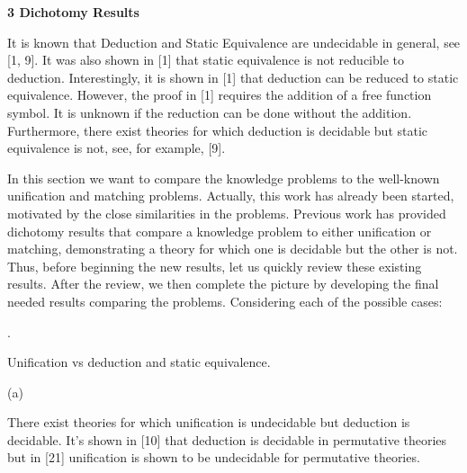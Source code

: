  
 
 


 
\par\medskip\noindent\textbf{3 Dichotomy Results}\par
 
 
It is known that Deduction and Static Equivalence are undecidable in general, see [1, 9]. It was also shown in [1] that static equivalence is not reducible to deduction. Interestingly, it is shown in [1] that deduction can be reduced to static equivalence. However, the proof in [1] requires the addition of a free function symbol. It is unknown if the reduction can be done without the addition. Furthermore, there exist theories for which deduction is decidable but static equivalence is not, see, for example, [9].\par
 
 
 
In this section we want to compare the knowledge problems to the well-known unification and matching problems. Actually, this work has already been started, motivated by the close similarities in the problems. Previous work has provided dichotomy results that compare a knowledge problem to either unification or matching, demonstrating a theory for which one is decidable but the other is not. Thus, before beginning the new results, let us quickly review these existing results. After the review, we then complete the picture by developing the final needed results comparing the problems. Considering each of the possible cases:\par
  
\par{}. 
 
Unification vs deduction and static equivalence.\par
  
\par\noindent  (a) 
 
There exist theories for which unification is undecidable but deduction is decidable. It’s shown in [10] that deduction is decidable in permutative theories but in [21] unification is shown to be undecidable for permutative theories.\par
 
